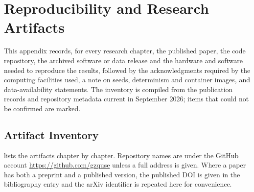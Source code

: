 \chapter{Reproducibility and Research Artifacts}\label{app:repro}


This appendix records, for every research chapter, the published paper, the code repository, the archived software or data release and the hardware and software needed to reproduce the results, followed by the acknowledgments required by the computing facilities used, a note on seeds, determinism and container images, and data-availability statements. The inventory is compiled from the publication records and repository metadata current in September 2026; items that could not be confirmed are marked.

\section{Artifact Inventory}\label{sec:apprepro:inventory}

 lists the artifacts chapter by chapter. Repository names are under the GitHub account \url{https://github.com/gzquse} unless a full address is given. Where a paper has both a preprint and a published version, the published DOI is given in the bibliography entry and the arXiv identifier is repeated here for convenience.

